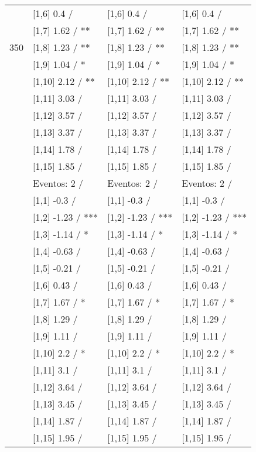 \begin{table}
\begin{tabular}[t]{llll}
 & {}[1,6] 0.4  / & {}[1,6] 0.4  / & {}[1,6] 0.4  /\\
 & {}[1,7] 1.62  / ** & {}[1,7] 1.62  / ** & {}[1,7] 1.62  / **\\
350 & {}[1,8] 1.23  / ** & {}[1,8] 1.23  / ** & {}[1,8] 1.23  / **\\
\addlinespace
 & {}[1,9] 1.04  / * & {}[1,9] 1.04  / * & {}[1,9] 1.04  / *\\
 & {}[1,10] 2.12  / ** & {}[1,10] 2.12  / ** & {}[1,10] 2.12  / **\\
 & {}[1,11] 3.03  / & {}[1,11] 3.03  / & {}[1,11] 3.03  /\\
 & {}[1,12] 3.57  / & {}[1,12] 3.57  / & {}[1,12] 3.57  /\\
 & {}[1,13] 3.37  / & {}[1,13] 3.37  / & {}[1,13] 3.37  /\\
\addlinespace
 & {}[1,14] 1.78  / & {}[1,14] 1.78  / & {}[1,14] 1.78  /\\
 & {}[1,15] 1.85  / & {}[1,15] 1.85  / & {}[1,15] 1.85  /\\
 & Eventos:  2 / & Eventos:  2 / & Eventos:  2 /\\
 & {}[1,1] -0.3  / & {}[1,1] -0.3  / & {}[1,1] -0.3  /\\
 & {}[1,2] -1.23  / *** & {}[1,2] -1.23  / *** & {}[1,2] -1.23  / ***\\
\addlinespace
 & {}[1,3] -1.14  / * & {}[1,3] -1.14  / * & {}[1,3] -1.14  / *\\
 & {}[1,4] -0.63  / & {}[1,4] -0.63  / & {}[1,4] -0.63  /\\
 & {}[1,5] -0.21  / & {}[1,5] -0.21  / & {}[1,5] -0.21  /\\
 & {}[1,6] 0.43  / & {}[1,6] 0.43  / & {}[1,6] 0.43  /\\
 & {}[1,7] 1.67  / * & {}[1,7] 1.67  / * & {}[1,7] 1.67  / *\\
\addlinespace
500 & {}[1,8] 1.29  / & {}[1,8] 1.29  / & {}[1,8] 1.29  /\\
 & {}[1,9] 1.11  / & {}[1,9] 1.11  / & {}[1,9] 1.11  /\\
 & {}[1,10] 2.2  / * & {}[1,10] 2.2  / * & {}[1,10] 2.2  / *\\
 & {}[1,11] 3.1  / & {}[1,11] 3.1  / & {}[1,11] 3.1  /\\
 & {}[1,12] 3.64  / & {}[1,12] 3.64  / & {}[1,12] 3.64  /\\
\addlinespace
 & {}[1,13] 3.45  / & {}[1,13] 3.45  / & {}[1,13] 3.45  /\\
 & {}[1,14] 1.87  / & {}[1,14] 1.87  / & {}[1,14] 1.87  /\\
 & {}[1,15] 1.95  / & {}[1,15] 1.95  / & {}[1,15] 1.95  /\\
\bottomrule
\end{tabular}
\end{table}
